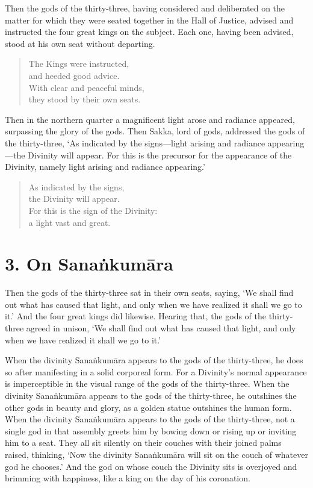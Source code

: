 \documentclass[12pt,openany]{book}%
\begin{document}
Then the gods of the thirty-three, having considered and deliberated on the matter for which they were seated together in the Hall of Justice, advised and instructed the four great kings on the subject. Each one, having been advised, stood at his own seat without departing. 

\begin{verse}%
The Kings were instructed, \\
and heeded good advice. \\
With clear and peaceful minds, \\
they stood by their own seats. 

%
\end{verse}

Then in the northern quarter a magnificent light arose and radiance appeared, surpassing the glory of the gods. Then Sakka, lord of gods, addressed the gods of the thirty-three, ‘As indicated by the signs—light arising and radiance appearing—the Divinity will appear. For this is the precursor for the appearance of the Divinity, namely light arising and radiance appearing.’ 

\begin{verse}%
As indicated by the signs, \\
the Divinity will appear. \\
For this is the sign of the Divinity: \\
a light vast and great. 

%
\end{verse}

\section*{3. On \textsanskrit{Sanaṅkumāra} }

Then the gods of the thirty-three sat in their own seats, saying, ‘We shall find out what has caused that light, and only when we have realized it shall we go to it.’ And the four great kings did likewise. Hearing that, the gods of the thirty-three agreed in unison, ‘We shall find out what has caused that light, and only when we have realized it shall we go to it.’ 

When the divinity \textsanskrit{Sanaṅkumāra} appears to the gods of the thirty-three, he does so after manifesting in a solid corporeal form. For a Divinity’s normal appearance is imperceptible in the visual range of the gods of the thirty-three. When the divinity \textsanskrit{Sanaṅkumāra} appears to the gods of the thirty-three, he outshines the other gods in beauty and glory, as a golden statue outshines the human form. When the divinity \textsanskrit{Sanaṅkumāra} appears to the gods of the thirty-three, not a single god in that assembly greets him by bowing down or rising up or inviting him to a seat. They all sit silently on their couches with their joined palms raised, thinking, ‘Now the divinity \textsanskrit{Sanaṅkumāra} will sit on the couch of whatever god he chooses.’ And the god on whose couch the Divinity sits is overjoyed and brimming with happiness, like a king on the day of his coronation. 
\end{document}
